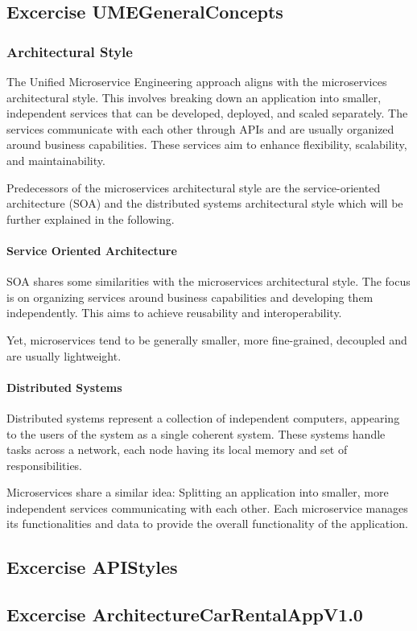 \subsection{Excercise UMEGeneralConcepts}
\label{sec:ume_general_concepts}
\subsubsection*{Architectural Style}
The Unified Microservice Engineering approach aligns with the microservices architectural style.
This involves breaking down an application into smaller, independent services that can be developed, deployed, and scaled separately.
The services communicate with each other through APIs and are usually organized around business capabilities.
These services aim to enhance flexibility, scalability, and maintainability.

Predecessors of the microservices architectural style are the service-oriented architecture (SOA) and the distributed systems architectural style which will be further explained in the following.

\paragraph*{Service Oriented Architecture}
SOA shares some similarities with the microservices architectural style.
The focus is on organizing services around business capabilities and developing them independently.
This aims to achieve reusability and interoperability.

Yet, microservices tend to be generally smaller, more fine-grained, decoupled and are usually lightweight.

\paragraph*{Distributed Systems}
Distributed systems represent a collection of independent computers, appearing to the users of the system as a single coherent system.
These systems handle tasks across a network, each node having its local memory and set of responsibilities.

Microservices share a similar idea: Splitting an application into smaller, more independent services communicating with each other.
Each microservice manages its functionalities and data to provide the overall functionality of the application.

\subsection{Excercise APIStyles}
\label{sec:api_styles}

\subsection{Excercise ArchitectureCarRentalAppV1.0}
\label{sec:architecture_car_rental_app_v1_0}

